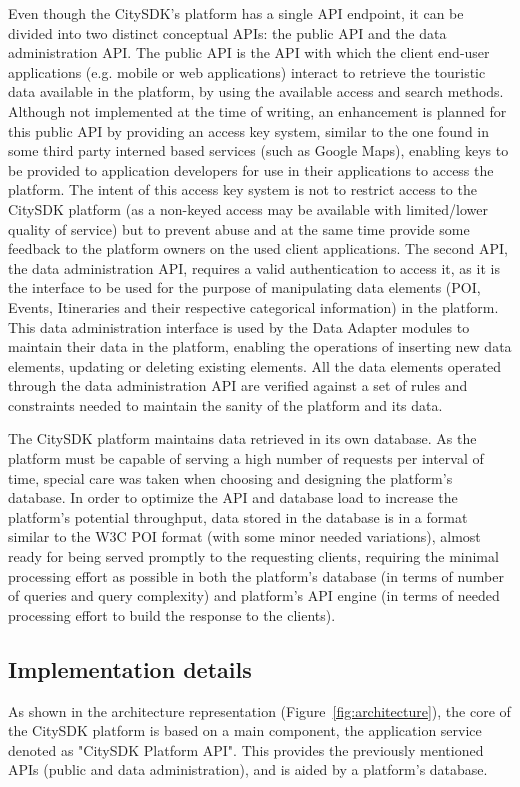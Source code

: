 \documentclass[times,doublespace]{ettauth}%
\begin{document}
Even though the CitySDK's platform has a single API endpoint, it can be divided into two distinct conceptual APIs: the public API and the data administration API. 
The public API is the API with which the client end-user applications (e.g. mobile or web applications) interact to retrieve the touristic data available in the platform, by using the available access and search methods. 
Although not implemented at the time of writing, an enhancement is planned for this public API by providing an access key system, similar to the one found in some third party interned based services (such as Google Maps), enabling keys to be provided to application developers for use in their applications to access the platform. 
The intent of this access key system is not to restrict access to the CitySDK platform (as a non-keyed access may be available with limited/lower quality of service) but to prevent abuse and at the same time provide some feedback to the platform owners on the used client applications. 
The second API, the data administration API, requires a valid authentication to access it, as it is the interface to be used for the purpose of manipulating data elements (\ac{POI}, Events, Itineraries and their respective categorical information) in the platform. 
This data administration interface is used by the Data Adapter modules to maintain their data in the platform, enabling the operations of inserting new data elements, updating or deleting existing elements. 
All the data elements operated through the data administration API are verified against a set of rules and constraints needed to maintain the sanity of the platform and its data.

The CitySDK platform maintains data retrieved in its own database. 
As the platform must be capable of serving a high number of requests per interval of time, special care was taken when choosing and designing the platform's database. 
In order to optimize the API and database load to increase the platform's potential throughput, data stored in the database is in a format similar to the W3C POI format (with some minor needed variations), almost ready for being served promptly to the requesting clients, requiring the minimal processing effort as possible in both the platform's database (in terms of number of queries and query complexity) and platform's API engine (in terms of needed processing effort to build the response to the clients).

\subsection{Implementation details}
As shown in the architecture representation (Figure~\ref{fig:architecture}), the core of the CitySDK platform is based on a main component, the application service denoted as "CitySDK Platform API".
This provides the previously mentioned APIs (public and data administration), and is aided by a platform's database. 
\end{document}
